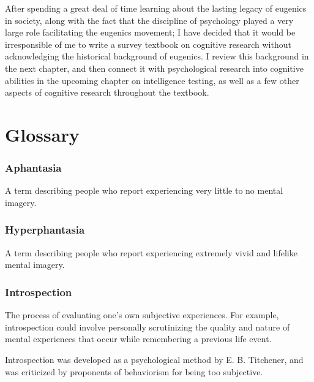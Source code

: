 \documentclass[
  oneside,
  12pt]{crumpbook}
\begin{document}
After spending a great deal of time learning about the lasting legacy of eugenics in society, along with the fact that the discipline of psychology played a very large role facilitating the eugenics movement; I have decided that it would be irresponsible of me to write a survey textbook on cognitive research without acknowledging the historical background of eugenics. I review this background in the next chapter, and then connect it with psychological research into cognitive abilities in the upcoming chapter on intelligence testing, as well as a few other aspects of cognitive research throughout the textbook.

\hypertarget{glossary}{%
\section{Glossary}\label{glossary}}

\hypertarget{gls-aphantasia}{%
\subsubsection*{Aphantasia}\label{gls-aphantasia}}

A term describing people who report experiencing very little to no mental imagery.

\hypertarget{gls-hyperphantasia}{%
\subsubsection*{Hyperphantasia}\label{gls-hyperphantasia}}

A term describing people who report experiencing extremely vivid and lifelike mental imagery.

\hypertarget{gls-introspection}{%
\subsubsection*{Introspection}\label{gls-introspection}}

The process of evaluating one's own subjective experiences. For example, introspection could involve personally scrutinizing the quality and nature of mental experiences that occur while remembering a previous life event.

Introspection was developed as a psychological method by E. B. Titchener, and was criticized by proponents of behaviorism for being too subjective.
\end{document}
